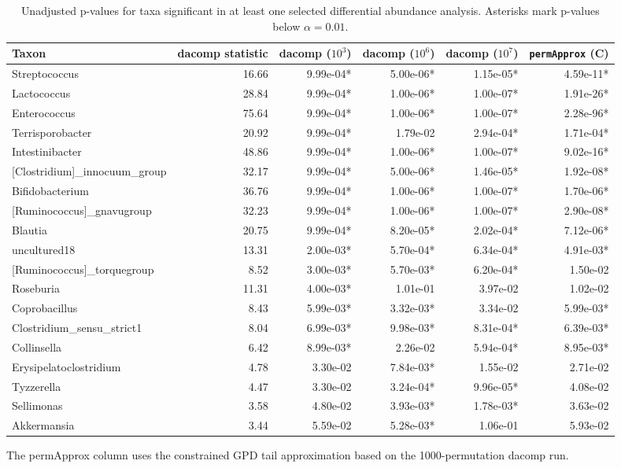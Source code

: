 \begin{table}[!h]
\centering
\caption{\label{tab:application:diff-abundance-pvalues}Unadjusted p-values for taxa significant in at least one selected differential abundance analysis. Asterisks mark p-values below $\alpha = 0.01$.}
\centering
\begin{threeparttable}
\begin{tabular}[t]{lrrrrr}
\toprule
Taxon & dacomp statistic & dacomp ($10^3$) & dacomp ($10^6$) & dacomp ($10^7$) & \texttt{permApprox} (C)\\
\midrule
Streptococcus & 16.66 & 9.99e-04* & 5.00e-06* & 1.15e-05* & 4.59e-11*\\
Lactococcus & 28.84 & 9.99e-04* & 1.00e-06* & 1.00e-07* & 1.91e-26*\\
Enterococcus & 75.64 & 9.99e-04* & 1.00e-06* & 1.00e-07* & 2.28e-96*\\
Terrisporobacter & 20.92 & 9.99e-04* & 1.79e-02 & 2.94e-04* & 1.71e-04*\\
Intestinibacter & 48.86 & 9.99e-04* & 1.00e-06* & 1.00e-07* & 9.02e-16*\\
\addlinespace
{}[Clostridium]_innocuum_group & 32.17 & 9.99e-04* & 5.00e-06* & 1.46e-05* & 1.92e-08*\\
Bifidobacterium & 36.76 & 9.99e-04* & 1.00e-06* & 1.00e-07* & 1.70e-06*\\
{}[Ruminococcus]_gnavugroup & 32.23 & 9.99e-04* & 1.00e-06* & 1.00e-07* & 2.90e-08*\\
Blautia & 20.75 & 9.99e-04* & 8.20e-05* & 2.02e-04* & 7.12e-06*\\
uncultured18 & 13.31 & 2.00e-03* & 5.70e-04* & 6.34e-04* & 4.91e-03*\\
\addlinespace
{}[Ruminococcus]_torquegroup & 8.52 & 3.00e-03* & 5.70e-03* & 6.20e-04* & 1.50e-02\\
Roseburia & 11.31 & 4.00e-03* & 1.01e-01 & 3.97e-02 & 1.02e-02\\
Coprobacillus & 8.43 & 5.99e-03* & 3.32e-03* & 3.34e-02 & 5.99e-03*\\
Clostridium_sensu_strict1 & 8.04 & 6.99e-03* & 9.98e-03* & 8.31e-04* & 6.39e-03*\\
Collinsella & 6.42 & 8.99e-03* & 2.26e-02 & 5.94e-04* & 8.95e-03*\\
\addlinespace
Erysipelatoclostridium & 4.78 & 3.30e-02 & 7.84e-03* & 1.55e-02 & 2.71e-02\\
Tyzzerella & 4.47 & 3.30e-02 & 3.24e-04* & 9.96e-05* & 4.08e-02\\
Sellimonas & 3.58 & 4.80e-02 & 3.93e-03* & 1.78e-03* & 3.63e-02\\
Akkermansia & 3.44 & 5.59e-02 & 5.28e-03* & 1.06e-01 & 5.93e-02\\
\bottomrule
\end{tabular}
\begin{tablenotes}
\item The permApprox column uses the constrained GPD tail approximation based on the 1000-permutation dacomp run.
\end{tablenotes}
\end{threeparttable}
\end{table}
